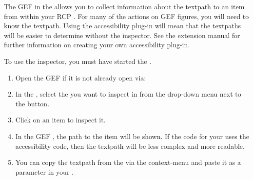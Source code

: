 
The GEF \gdinspector in the \ite{} allows you to collect information about the
textpath to an item from within your RCP \gdaut{}. For many of the actions on
GEF figures, you will need to know the textpath. Using the  accessibility
plug-in will mean that the textpaths will be easier to determine without the
inspector. See the extension manual for further information on creating your own
accessibility plug-in.

To use the inspector, you must have started the \gdaut{} . 
\begin{enumerate}
\item Open the GEF \gdinspector{} if it is not already open via:\\
\item In the \gdinspector{}, select the \gdaut{} you want to inspect in from the drop-down menu next to the  button. 
\item Click on an item to inspect it.
\item In the GEF \gdinspector{}, the path to the item will be shown. If the code for your \gdaut{} uses the accessibility code, then the textpath will be less complex and more readable. 
\item You can copy the textpath from the \gdinspector{} via the context-menu and paste it as a parameter in your \gdcases{}. 
\end{enumerate}
